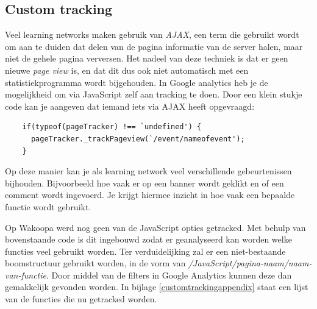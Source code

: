 \documentclass[a4paper, 10pt, pdftex]{report}
\begin{document}
    \subsection{Custom tracking}
    Veel learning networks maken gebruik van \emph{AJAX}, een term die gebruikt wordt om aan te duiden dat delen van de pagina informatie van de server halen, maar niet de gehele pagina verversen. Het nadeel van deze techniek is dat er geen nieuwe \emph{page view} is, en dat dit dus ook niet automatisch met een statistiekprogramma wordt bijgehouden. In Google analytics heb je de mogelijkheid om via JavaScript zelf aan tracking te doen. Door een klein stukje code kan je aangeven dat iemand iets via AJAX heeft opgevraagd:
    \begin{verbatim}
    if(typeof(pageTracker) !== `undefined') {
      pageTracker._trackPageview(`/event/nameofevent');
    }
    \end{verbatim}
    Op deze manier kan je als learning network veel verschillende gebeurtenissen bijhouden. Bijvoorbeeld hoe vaak er op een banner wordt geklikt en of een comment wordt ingevoerd. Je krijgt hiermee inzicht in hoe vaak een bepaalde functie wordt gebruikt.

    Op Wakoopa werd nog geen van de JavaScript opties getracked. Met behulp van bovenstaande code is dit ingebouwd zodat er geanalyseerd kan worden welke functies veel gebruikt worden. Ter verduidelijking zal er een niet-bestaande boomstructuur gebruikt worden, in de vorm van \emph{/JavaScript/pagina-naam/naam-van-functie}. Door middel van de filters in Google Analytics kunnen deze dan gemakkelijk gevonden worden. In bijlage \ref{customtrackingappendix} staat een lijst van de functies die nu getracked worden.
\end{document}
